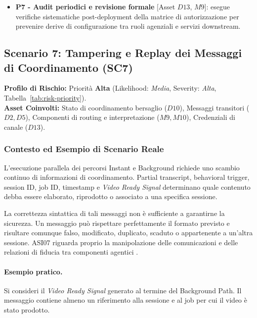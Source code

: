 \documentclass[11pt,a4paper]{article}
\begin{document}
\begin{itemize}
    \item \textbf{P7 - Audit periodici e revisione formale} [Asset $D13$, $M9$]:
    esegue verifiche sistematiche post-deployment della matrice di autorizzazione per prevenire derive di configurazione tra ruoli agenziali e servizi downstream.
\end{itemize}

\subsection{Scenario 7: Tampering e Replay dei Messaggi di Coordinamento (SC7)}
\label{sec:sc7}

\noindent\textbf{Profilo di Rischio:} Priorità \textbf{Alta} (Likelihood: \emph{Media}, Severity: \emph{Alta}, Tabella~\ref{tab:risk-priority}).\\
\textbf{Asset Coinvolti:} Stato di coordinamento bersaglio ($D10$), Messaggi transitori ($D2, D5$), Componenti di routing e interpretazione ($M9, M10$), Credenziali di canale ($D13$).

\subsubsection{Contesto ed Esempio di Scenario Reale}

L'esecuzione parallela dei percorsi Instant e Background richiede uno
scambio continuo di informazioni di coordinamento. Partial transcript,
behavioral trigger, session ID, job ID, timestamp e
\emph{Video Ready Signal} determinano quale contenuto debba essere
elaborato, riprodotto o associato a una specifica sessione.

La correttezza sintattica di tali messaggi non è sufficiente a
garantirne la sicurezza. Un messaggio può rispettare perfettamente il
formato previsto e risultare comunque falso, modificato, duplicato,
scaduto o appartenente a un'altra sessione. ASI07 riguarda proprio la
manipolazione delle comunicazioni e delle relazioni di fiducia tra
componenti agentici \cite{owaspagentic,owaspagenticthreats}.

\paragraph{Esempio pratico.}
Si consideri il \emph{Video Ready Signal} generato al termine del
Background Path. Il messaggio contiene almeno un riferimento alla
sessione e al job per cui il video è stato prodotto.
\end{document}
